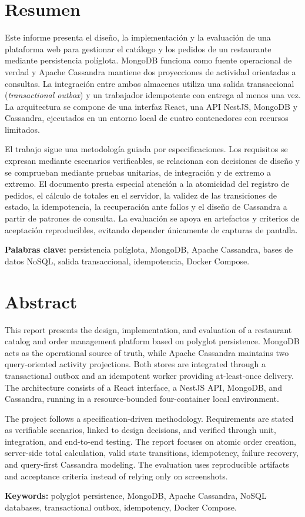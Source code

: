 \chapter*{Resumen}

Este informe presenta el diseño, la implementación y la evaluación de una plataforma web para gestionar el catálogo y los pedidos de un restaurante mediante persistencia políglota. MongoDB funciona como fuente operacional de verdad y Apache Cassandra mantiene dos proyecciones de actividad orientadas a consultas. La integración entre ambos almacenes utiliza una salida transaccional (\emph{transactional outbox}) y un trabajador idempotente con entrega al menos una vez. La arquitectura se compone de una interfaz React, una API NestJS, MongoDB y Cassandra, ejecutados en un entorno local de cuatro contenedores con recursos limitados.

El trabajo sigue una metodología guiada por especificaciones. Los requisitos se expresan mediante escenarios verificables, se relacionan con decisiones de diseño y se comprueban mediante pruebas unitarias, de integración y de extremo a extremo. El documento presta especial atención a la atomicidad del registro de pedidos, el cálculo de totales en el servidor, la validez de las transiciones de estado, la idempotencia, la recuperación ante fallos y el diseño de Cassandra a partir de patrones de consulta. La evaluación se apoya en artefactos y criterios de aceptación reproducibles, evitando depender únicamente de capturas de pantalla.

\noindent\textbf{Palabras clave:} persistencia políglota, MongoDB, Apache Cassandra, bases de datos NoSQL, salida transaccional, idempotencia, Docker Compose.

\chapter*{Abstract}

This report presents the design, implementation, and evaluation of a restaurant catalog and order management platform based on polyglot persistence. MongoDB acts as the operational source of truth, while Apache Cassandra maintains two query-oriented activity projections. Both stores are integrated through a transactional outbox and an idempotent worker providing at-least-once delivery. The architecture consists of a React interface, a NestJS API, MongoDB, and Cassandra, running in a resource-bounded four-container local environment.

The project follows a specification-driven methodology. Requirements are stated as verifiable scenarios, linked to design decisions, and verified through unit, integration, and end-to-end testing. The report focuses on atomic order creation, server-side total calculation, valid state transitions, idempotency, failure recovery, and query-first Cassandra modeling. The evaluation uses reproducible artifacts and acceptance criteria instead of relying only on screenshots.

\noindent\textbf{Keywords:} polyglot persistence, MongoDB, Apache Cassandra, NoSQL databases, transactional outbox, idempotency, Docker Compose.
